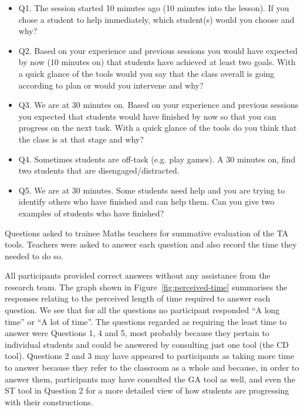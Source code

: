 \begin{table}[tb]
  \centering
  \begin{framed}
  \begin{itemize}
  \item Q1. The session started 10 minutes ago (10 minutes into the lesson). 
    If you chose a student to help immediately, 
    which student(s) would you choose and why?
  \item Q2. Based on your experience and previous sessions you would have
    expected by now (10 minutes on) that students have achieved at
    least two goals. With a quick glance of the tools would you say
    that the class overall is going according to plan or would you
    intervene and why?
  \item Q3. We are at 30 minutes on. Based on your experience and
    previous sessions you expected that students would have finished
    by now so that you can progress on the next task. With a quick
    glance of the tools do you think that the class is at that stage
    and why?
  \item Q4. Sometimes students are off-task (e.g. play
    games). A 30 minutes on, find two students that are
    disengaged/distracted. 
  \item Q5. We are at 30 minutes. Some students need help and you are
    trying to identify others who have finished and can help them. Can
    you give two examples of students who have finished? 
  \end{itemize}    
  \end{framed}
  \vspace{-1em}
  \caption{Questions asked to trainee Maths teachers for summative
    evaluation of the TA tools. Teachers were asked to answer each
    question and also record the time they needed to do so.} 
  \label{fig:questions-pgce}
\end{table}

All participants provided correct answers without any assistance from the
research team. The graph shown in Figure~\ref{fig:perceived-time}
summarises the responses relating to the perceived length of time required to
answer each question. We see that for all
the questions no participant responded ``A long time'' or 
``A lot of time''. 
The questions regarded as
requiring the least time to answer were Questions 1, 4 and 5, 
most probably because they pertain to individual students and could be
answered by consulting just one tool (the CD tool). Questions 2
and 3 may have appeared to participants as taking more time to answer
because they refer to the classroom as a whole and because, in order
to answer them, participants may have consulted the GA tool
as well, and even the ST tool in Question 2 for a more detailed view
of how students are progressing with their constructions. 

